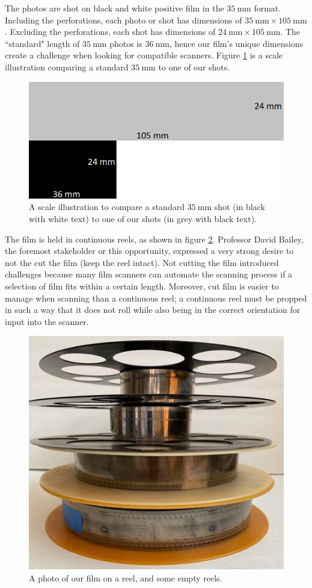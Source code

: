 \documentclass[12pt]{article} %
\begin{document}
The photos are shot on black and white positive film in the $35 \ \text{mm}$ format. Including the perforations, each photo or shot has dimensions of $35 \ \text{mm} \times 105 \ \text{mm}$. Excluding the perforations, each shot has dimensions of $24 \ \text{mm} \times 105 \ \text{mm}$. The ``standard" length of $35 \ \text{mm}$ photos is $36 \ \text{mm}$, hence our film's unique dimensions create a challenge when looking for compatible scanners. Figure \ref{fig: film scale} is a scale illustration comparing a standard $35 \ \text{mm}$ to one of our shots.
\begin{figure}[H]
    \centering
    \includegraphics[width=0.7\linewidth]{Images/filmscale.png}
    \caption{A scale illustration to compare a standard $35 \ \text{mm}$ shot (in black with white text) to one of our shots (in grey with black text).}
    \label{fig: film scale}
\end{figure}

The film is held in continuous reels, as shown in figure \ref{fig: reel pic}. Professor David Bailey, the foremost stakeholder or this opportunity, expressed a very strong desire to not the cut the film (keep the reel intact). Not cutting the film introduced challenges because many film scanners can automate the scanning process if a selection of film fits within a certain length. Moreover, cut film is easier to manage when scanning than a continuous reel; a continuous reel must be propped in such a way that it does not roll while also being in the correct orientation for input into the scanner.
\begin{figure}[H]
    \centering
    \includegraphics[width=0.7\linewidth]{Images/reelpic.jpg}
    \caption{A photo of our film on a reel, and some empty reels.}
    \label{fig: reel pic}
\end{figure}
\end{document}
